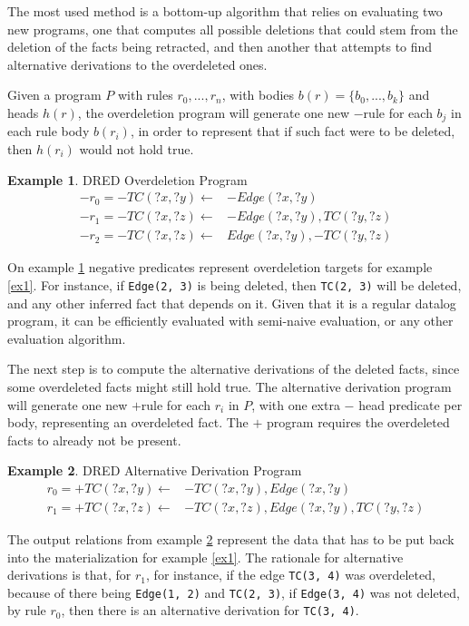 \documentclass[sigconf,screen,review=false,natbib]{acmart}
\theoremstyle{definition}
\newtheorem{exmp}{Example}[section]
\begin{document}
The most used method is a bottom-up algorithm\cite{dred} that relies on evaluating two new programs, one that computes all possible
deletions that could stem from the deletion of the facts being retracted, and then another that attempts to find alternative derivations
to the overdeleted ones.

Given a program $P$ with rules $r_0, ..., r_n$, with bodies $b(r) = \{b_0, ..., b_k\}$ and heads $h(r)$, the
overdeletion program will generate one new $-$rule for each $b_j$ in each rule body $b(r_i)$, in order to represent
that if such fact were to be deleted, then $h(r_i)$ would not hold true.
\begin{exmp}{DRED Overdeletion Program}
	\begin{align*}
		-r_0 = -TC(?x, ?y) \leftarrow & -Edge(?x, ?y)             \\
		-r_1 = -TC(?x, ?z) \leftarrow & -Edge(?x, ?y), TC(?y, ?z) \\
		-r_2 = -TC(?x, ?z) \leftarrow & Edge(?x, ?y), -TC(?y, ?z)
	\end{align*}
	\label{ex6}
\end{exmp}
On example \ref{ex6} negative predicates represent overdeletion targets for example \ref{ex1}. For instance, if \verb|Edge(2, 3)| is
being deleted, then \verb|TC(2, 3)| will be deleted, and any other inferred fact that depends on it. Given that it is a regular datalog
program, it can be efficiently evaluated with semi-naive evaluation, or any other evaluation algorithm.

The next step is to compute the alternative derivations of the deleted facts, since some overdeleted facts might
still hold true. The alternative derivation program will generate one new $+$rule for each $r_i$ in $P$, with
one extra $-$ head predicate per body, representing an overdeleted fact. The $+$ program requires the overdeleted
facts to already not be present.
\begin{exmp}{DRED Alternative Derivation Program}
	\begin{align*}
		r_0 = +TC(?x, ?y) \leftarrow & -TC(?x, ?y), Edge(?x, ?y)             \\
		r_1 = +TC(?x, ?z) \leftarrow & -TC(?x, ?z), Edge(?x, ?y), TC(?y, ?z)
	\end{align*}
	\label{ex7}
\end{exmp}
The output relations from example \ref{ex7} represent the data that has to be put back into the materialization for example \ref{ex1}. The
rationale for alternative derivations is that, for $r_1$, for instance, if the edge \verb|TC(3, 4)| was overdeleted, because of there being
\verb|Edge(1, 2)| and \verb|TC(2, 3)|, if \verb|Edge(3, 4)| was not deleted, by rule $r_0$, then there is an alternative derivation for \verb|TC(3, 4)|.
\end{document}
